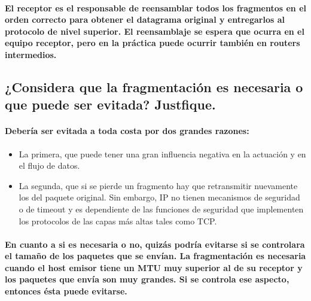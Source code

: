 \documentclass[11pt]{article} %
\begin{document}
        \paragraph{El receptor es el responsable de reensamblar todos los fragmentos en el orden correcto para obtener el datagrama original y entregarlos al protocolo de nivel superior. El reensamblaje se espera que ocurra en el equipo receptor, pero en la práctica puede ocurrir también en routers intermedios.}

        \subsection{¿Considera que la fragmentación es necesaria o que puede ser evitada? Justfique.}

        \paragraph{Debería ser evitada a toda costa por dos grandes razones:}
        \begin{itemize}
            \item La primera, que puede tener una gran influencia negativa en la actuación y en el flujo de datos.
            \item La segunda, que si se pierde un fragmento hay que retransmitir nuevamente los del paquete original. Sin embargo, IP no tienen mecanismos de seguridad o de timeout y es dependiente de las funciones de seguridad que implementen los protocolos de las capas más altas tales como TCP.
        \end{itemize}
        \paragraph{En cuanto a si es necesaria o no, quizás podría evitarse si se controlara el tamaño de los paquetes que se envían. La fragmentación es necesaria cuando el host emisor tiene un MTU muy superior al de su receptor y los paquetes que envía son muy grandes. Si se controla ese aspecto, entonces ésta puede evitarse.}
\end{document}
